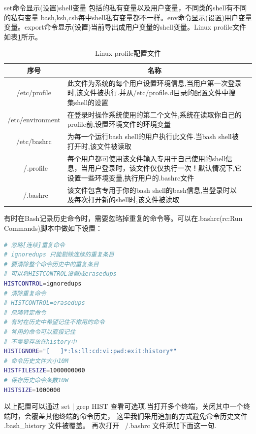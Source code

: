 \documentclass[12pt]{book}
\numberwithin{dummy}{section}
\theoremstyle{ocrenumbox}
\theoremstyle{blacknumex}
\theoremstyle{blacknumbox}
\theoremstyle{ocrenum}
\begin{document}
set命令显示(设置)shell变量 包括的私有变量以及用户变量，不同类的shell有不同的私有变量 bash,ksh,csh每中shell私有变量都不一样。env命令显示(设置)用户变量变量。export命令显示(设置)当前导出成用户变量的shell变量。Linux profile文件如表\ref{table:linuxconfigfile}所示。

\begin{table}
	\caption{Linux profile配置文件}
	\label{table:linuxconfigfile}
	\begin{center}
	\begin{tabular}{cp{10cm}c}
		\hline
		\multirow{1}{*}{序号}
		& \multicolumn{1}{c}{名称}  \\
		\hline			
		/etc/profile  & 此文件为系统的每个用户设置环境信息,当用户第一次登录时,该文件被执行.并从/etc/profile.d目录的配置文件中搜集shell的设置 \\
		\hline	
		/etc/environment & 在登录时操作系统使用的第二个文件,系统在读取你自己的profile前,设置环境文件的环境变量 \\
		\hline
		/etc/bashrc & 为每一个运行bash shell的用户执行此文件.当bash shell被打开时,该文件被读取\\
		\hline
		~/.profile & 每个用户都可使用该文件输入专用于自己使用的shell信息，当用户登录时，该文件仅仅执行一次！默认情况下,它设置一些环境变量,执行用户的.bashrc文件\\
		\hline
		~/.bashrc &  该文件包含专用于你的bash shell的bash信息,当登录时以及每次打开新的shell时,该文件被读取\\
		\hline
	\end{tabular}	
	\end{center}
\end{table}

有时在Bash记录历史命令时，需要忽略掉重复的命令等。可以在.bashrc(rc:Run Commands)脚本中做如下设置：

\begin{lstlisting}[language=Bash]
# 忽略[连续]重复命令
# ignoredups 只能剔除连续的重复条目
# 要清除整个命令历史中的重复条目
# 可以将HISTCONTROL设置成erasedups
HISTCONTROL=ignoredups
# 清除重复命令
# HISTCONTROL=erasedups
# 忽略特定命令
# 有时在历史中希望记住不常用的命令
# 常用的命令可以直接记住
# 不需要存放在history中
HISTIGNORE="[   ]*:ls:ll:cd:vi:pwd:exit:history*"
# 命令历史文件大小10M
HISTFILESIZE=1000000000
# 保存历史命令条数10W
HISTSIZE=1000000
\end{lstlisting}

以上配置可以通过 set | grep HIST 查看可选项.当打开多个终端，关闭其中一个终端时，会覆盖其他终端的命令历史， 这里我们采用追加的方式避免命令历史文件 .bash\_history 文件被覆盖。 再次打开 ~/.bashrc 文件添加下面这一句.
\end{document}
